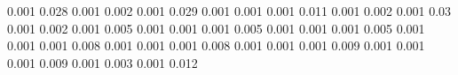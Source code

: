 0.001      0.028      %
0.001      0.002      %
0.001      0.029      %
0.001      0.001      %
0.001      0.011      %
0.001      0.002      %
0.001      0.03       %
0.001      0.002      %
0.001      0.005      %
0.001      0.001      %
0.001      0.005      %
0.001      0.001      %
0.001      0.005      %
0.001      0.001      %
0.001      0.008      %
0.001      0.001      %
0.001      0.008      %
0.001      0.001      %
0.001      0.009      %
0.001      0.001      %
0.001      0.009      %
0.001      0.003      %
0.001      0.012      %
